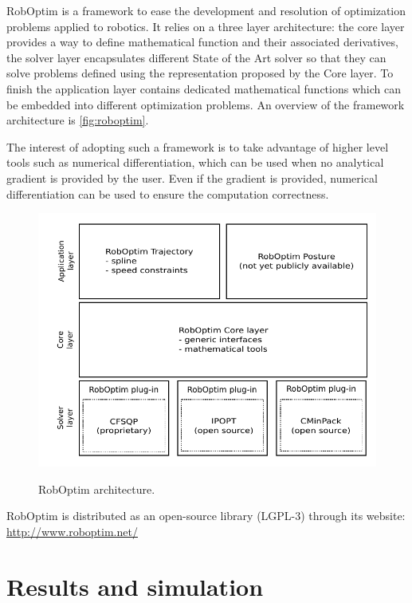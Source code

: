 \documentclass[letterpaper, 10 pt, conference]{ieeeconf}  %
\begin{document}
RobOptim is a framework to ease the development and resolution of
optimization problems applied to robotics. It relies on a three layer
architecture: the core layer provides a way to define mathematical
function and their associated derivatives, the solver layer encapsulates
different State of the Art solver so that they can solve problems
defined using the representation proposed by the Core layer. To finish
the application layer contains dedicated mathematical functions which
can be embedded into different optimization problems. An overview of
the framework architecture is \autoref{fig:roboptim}.


The interest of adopting such a framework is to take advantage of
higher level tools such as numerical differentiation, which can be
used when no analytical gradient is provided by the user. Even if the
gradient is provided, numerical differentiation can be used to ensure
the computation correctness.


\begin{figure}[htbp!]
  \includegraphics[width=\linewidth]{figure/roboptim-architecture.pdf}
  \label{fig:roboptim}
  \caption{RobOptim  architecture.}
\end{figure}


RobOptim is distributed as an open-source library (\mbox{LGPL-3}) through its
website: \url{http://www.roboptim.net/}



\section{Results and simulation}
\label{sec:results}
\end{document}
